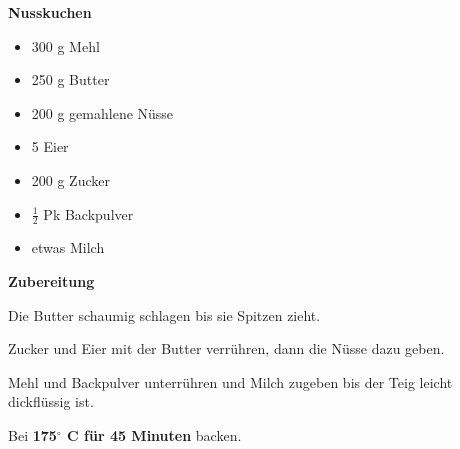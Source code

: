 

\parindent0pt	

\pagestyle{empty}


\textbf{{\LARGE Nusskuchen}}%

\hrulefill
\vspace*{\fill}
\begin{multicols}{2}	


\begin{itemize}
\item 300 g 	Mehl
\item 250 g	Butter
\item 200 g	gemahlene Nüsse
\item 5		Eier
\item 200 g	Zucker
\item $\frac{1}{2}$ Pk Backpulver
\item etwas Milch
\end{itemize}
\end{multicols}
\vfill									%




\vfill
\newpage
\textbf{{\LARGE Zubereitung}}%

\hrulefill

\vspace*{\fill}
\begin{multicols}{2}

Die Butter schaumig schlagen bis sie Spitzen zieht.\newline

Zucker und Eier mit der Butter verrühren, dann die 
Nüsse dazu geben.\newline

Mehl und Backpulver unterrühren und Milch zugeben bis
der Teig leicht dickflüssig ist.\newline

Bei \textbf{175$^\circ$ C für 45 Minuten} backen.


\end{multicols}
\vfill
